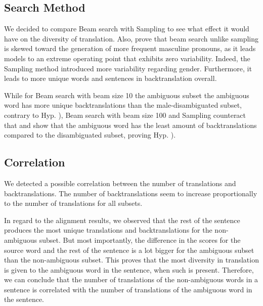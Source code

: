 \subsection{Search Method} %

We decided to compare Beam search with Sampling to see what effect it would have on the diversity of translation. Also, \citet{roberts2020decoding} prove that beam search unlike sampling is skewed toward the generation of more frequent masculine pronouns, as it leads models to an extreme operating point that exhibits zero variability. Indeed, the Sampling method introduced more variability regarding gender. Furthermore, it leads to more unique words and sentences in backtranslation overall. 

While for Beam search with beam size 10 the ambiguous subset the ambiguous word has more unique backtranslations than the male-disambiguated subset, contrary to Hyp. ), Beam search with beam size 100 and Sampling counteract that and show that the ambiguous word has the least amount of backtranslations compared to the disambiguated subset, proving Hyp. ).


\subsection{Correlation} 

We detected a possible correlation between the number of translations and backtranslations. The number of backtranslations seem to increase proportionally to the number of translations for all subsets.

In regard to the alignment results, we observed that the rest of the sentence produces the most unique translations and backtranslations for the non-ambiguous subset. But most importantly, the difference in the scores for the source word and the rest of the sentence is a lot bigger for the ambiguous subset than the non-ambiguous subset. This proves that the most diversity in translation is given to the ambiguous word in the sentence, when such is present. Therefore, we can conclude that the number of translations of the non-ambiguous words in a sentence is correlated with the number of translations of the ambiguous word in the sentence.



